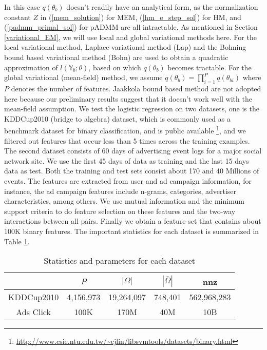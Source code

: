 \documentclass{article}
\newcommand{\1}[0]{\ensuremath{\boldsymbol{1}}\xspace}
\begin{document}
In this case $q(\theta_b)$ doesn't readily have an analytical form, as the normalization constant $Z$ in (\ref{mem_solution}) for MEM, (\ref{hm_e_step_sol}) for HM, and (\ref{padmm_primal_sol}) for pADMM are all intractable. As mentioned in Section \ref{variational_EM}, we will use local and global variational methods here. For the local variational method, Laplace variational method (Lap) \cite{Wang2013} and the Bohning bound based variational method (Bohn) \cite{Khan2010} are used to obtain a quadratic approximation of $l(\mathbb{Y}_b; \theta)$, based on which $q(\theta_b)$ becomes tractable. For the global variational (mean-field) method, we assume $q(\theta_b) = \prod_{i=1}^Pq(\theta_{bi})$ where $P$ denotes the number of features. Jaakkola bound based method \cite{Jaakkola2000} are not adopted here because our preliminary results suggest that it doesn't work well with the mean-field assumption. We test the logistic regression on two datasets, one is the  KDDCup2010 (bridge to algebra) dataset, which is commonly used as a benchmark dataset for binary classification, and is public available \footnote{\url{http://www.csie.ntu.edu.tw/~cjlin/libsvmtools/datasets/binary.html}}, and we filtered out features that occur less than 5 times across the training examples. The second dataset consists of 60 days of advertising event logs for a major social network site. We use the first 45 days of data as training and the last 15 days data as test. Both the training and test sets consist about 170 and 40 Millions of events. The features are extracted from user and ad campaign information, for instance, the ad campaign features include n-grams, categories, advertiser characteristics, among others. We use mutual information and the minimum support criteria to do feature selection on these features and the two-way interactions between all pairs. Finally we obtain a feature set that contains about 100K binary features. The important statistics for each dataset is summarized in Table \ref{lr_datasets}.

\begin{table}\label{lr_datasets}
\scriptsize
\caption{ Statistics and parameters for each dataset}
\begin{tabular}{c|cccc}
~& $P$ & $|\Omega|$ & $|\bar\Omega|$ & nnz \\
\hline
KDDCup2010 & 4,156,973 & 19,264,097 & 748,401 & 562,968,283\\
Ads Click & 100K & 170M & 40M  & 10B
\end{tabular}
\end{table}
\end{document}
